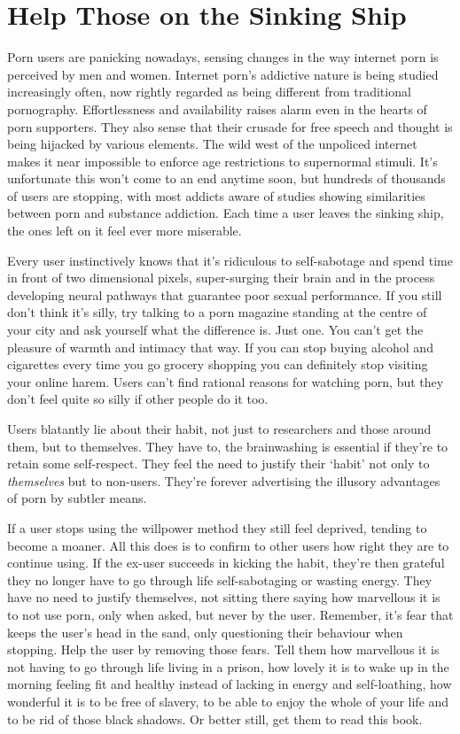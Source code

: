 \documentclass[
]{book}
\begin{document}
\hypertarget{help-those-on-the-sinking-ship}{%
\chapter{Help Those on the Sinking Ship}\label{help-those-on-the-sinking-ship}}

Porn users are panicking nowadays, sensing changes in the way internet porn is perceived by men and women. Internet porn's addictive nature is being studied increasingly often, now rightly regarded as being different from traditional pornography. Effortlessness and availability raises alarm even in the hearts of porn supporters. They also sense that their crusade for free speech and thought is being hijacked by various elements. The wild west of the unpoliced internet makes it near impossible to enforce age restrictions to supernormal stimuli. It's unfortunate this won't come to an end anytime soon, but hundreds of thousands of users are stopping, with most addicts aware of studies showing similarities between porn and substance addiction. Each time a user leaves the sinking ship, the ones left on it feel ever more miserable.

Every user instinctively knows that it's ridiculous to self-sabotage and spend time in front of two dimensional pixels, super-surging their brain and in the process developing neural pathways that guarantee poor sexual performance. If you still don't think it's silly, try talking to a porn magazine standing at the centre of your city and ask yourself what the difference is. Just one. You can't get the pleasure of warmth and intimacy that way. If you can stop buying alcohol and cigarettes every time you go grocery shopping you can definitely stop visiting your online harem. Users can't find rational reasons for watching porn, but they don't feel quite so silly if other people do it too.

Users blatantly lie about their habit, not just to researchers and those around them, but to themselves. They have to, the brainwashing is essential if they're to retain some self-respect. They feel the need to justify their `habit' not only to \emph{themselves} but to non-users. They're forever advertising the illusory advantages of porn by subtler means.

If a user stops using the willpower method they still feel deprived, tending to become a moaner. All this does is to confirm to other users how right they are to continue using. If the ex-user succeeds in kicking the habit, they're then grateful they no longer have to go through life self-sabotaging or wasting energy. They have no need to justify themselves, not sitting there saying how marvellous it is to not use porn, only when asked, but never by the user. Remember, it's fear that keeps the user's head in the sand, only questioning their behaviour when stopping. Help the user by removing those fears. Tell them how marvellous it is not having to go through life living in a prison, how lovely it is to wake up in the morning feeling fit and healthy instead of lacking in energy and self-loathing, how wonderful it is to be free of slavery, to be able to enjoy the whole of your life and to be rid of those black shadows. Or better still, get them to read this book.
\end{document}
